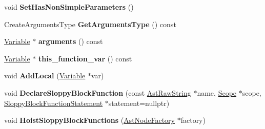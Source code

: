 \begin{DoxyCompactItemize}
\item 
\mbox{\label{classv8_1_1internal_1_1DeclarationScope_a0536e7df2af2577cfb21ab7560aeb541}} 
void {\bfseries Set\+Has\+Non\+Simple\+Parameters} ()
\item 
\mbox{\label{classv8_1_1internal_1_1DeclarationScope_a3d12d28275447f9c3248dd18d05a3f9d}} 
Create\+Arguments\+Type {\bfseries Get\+Arguments\+Type} () const
\item 
\mbox{\label{classv8_1_1internal_1_1DeclarationScope_a37880e00b958800bd698fa3326c646fa}} 
\mbox{\hyperlink{classv8_1_1internal_1_1Variable}{Variable}} $\ast$ {\bfseries arguments} () const
\item 
\mbox{\label{classv8_1_1internal_1_1DeclarationScope_a7eb295a0894ca1055464dfc4e13184b1}} 
\mbox{\hyperlink{classv8_1_1internal_1_1Variable}{Variable}} $\ast$ {\bfseries this\+\_\+function\+\_\+var} () const
\item 
\mbox{\label{classv8_1_1internal_1_1DeclarationScope_a4790aac80bb2e0d5abcc525f1e931037}} 
void {\bfseries Add\+Local} (\mbox{\hyperlink{classv8_1_1internal_1_1Variable}{Variable}} $\ast$var)
\item 
\mbox{\label{classv8_1_1internal_1_1DeclarationScope_ac6a318da84eb86b9cb45d6f77b2dc851}} 
void {\bfseries Declare\+Sloppy\+Block\+Function} (const \mbox{\hyperlink{classv8_1_1internal_1_1AstRawString}{Ast\+Raw\+String}} $\ast$name, \mbox{\hyperlink{classv8_1_1internal_1_1Scope}{Scope}} $\ast$scope, \mbox{\hyperlink{classv8_1_1internal_1_1SloppyBlockFunctionStatement}{Sloppy\+Block\+Function\+Statement}} $\ast$statement=nullptr)
\item 
\mbox{\label{classv8_1_1internal_1_1DeclarationScope_a56f7fd704501c58f743d8e8c573a8fde}} 
void {\bfseries Hoist\+Sloppy\+Block\+Functions} (\mbox{\hyperlink{classv8_1_1internal_1_1AstNodeFactory}{Ast\+Node\+Factory}} $\ast$factory)
\item 
\mbox{\label{classv8_1_1internal_1_1DeclarationScope_a6cef5ad45c17995011f06341e44f6d09}} 

\end{DoxyCompactItemize}
